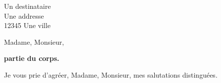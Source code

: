 \documentclass[a4paper, 12pt]{lettre}
\begin{document}

\begin{letter}{Un destinataire\\Une addresse\\12345 Une ville}
\def\concname{Objet :~} %

\opening{Madame, Monsieur,}

\textbf{partie du corps.}

\closing{Je vous prie d'agréer, Madame, Monsieur, mes salutations distinguées.}
\end{letter}
\end{document}
